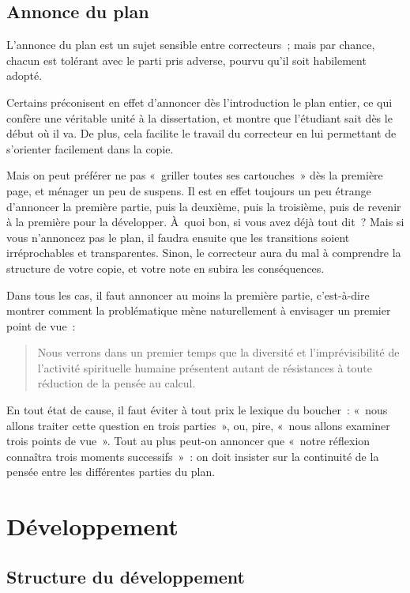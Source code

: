 \documentclass[a4paper,12pt]{article}
\begin{document}
\subsection{Annonce du plan}
\label{sec-2-4}

L'annonce du plan est un sujet sensible entre correcteurs ; mais par
chance, chacun est tolérant avec le parti pris adverse, pourvu qu'il
soit habilement adopté.

Certains préconisent en effet d'annoncer dès l'introduction le plan
entier, ce qui confère une véritable unité à la dissertation, et montre
que l'étudiant sait dès le début où il va. De plus, cela facilite le
travail du correcteur en lui permettant de s'orienter facilement dans la
copie.

Mais on peut préférer ne pas « griller toutes ses cartouches » dès la
première page, et ménager un peu de suspens. Il est en effet toujours un
peu étrange d'annoncer la première partie, puis la deuxième, puis la
troisième, puis de revenir à la première pour la développer. À quoi bon,
si vous avez déjà tout dit ? Mais si vous n'annoncez pas le plan, il
faudra ensuite que les transitions soient irréprochables et
transparentes. Sinon, le correcteur aura du mal à comprendre la
structure de votre copie, et votre note en subira les conséquences.

Dans tous les cas, il faut annoncer au moins la première partie,
c'est-à-dire montrer comment la problématique mène naturellement à
envisager un premier point de vue :

\begin{quote}
Nous verrons dans un premier temps que la diversité et
l'imprévisibilité de l'activité spirituelle humaine présentent autant
de résistances à toute réduction de la pensée au calcul.
\end{quote}

En tout état de cause, il faut éviter à tout prix le lexique du
boucher : « nous allons traiter cette question en trois parties », ou,
pire, « nous allons examiner trois points de vue ». Tout au plus peut-on
annoncer que « notre réflexion connaîtra trois moments successifs » : on
doit insister sur la continuité de la pensée entre les différentes
parties du plan.

\section{Développement}
\label{sec-3}

\subsection{Structure du développement}
\label{sec-3-1}
\end{document}
